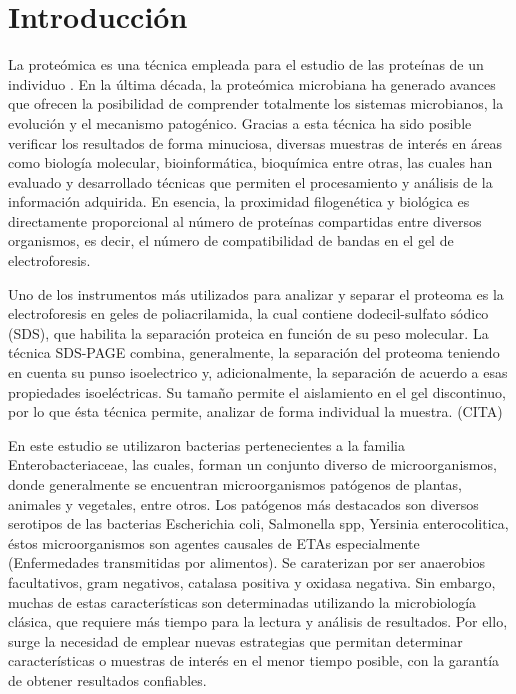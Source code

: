 \documentclass[%
 reprint,
 amsmath,amssymb,
 aps,
showkeys,
letter,
12pts
]{revtex4-1}
\begin{document}
\maketitle


\section{\label{sec:Intro}Introducción}
	La proteómica es una técnica empleada para el estudio de las proteínas de un individuo \cite{intro1}. En la última década, la proteómica microbiana ha generado avances que ofrecen la  posibilidad de comprender totalmente los sistemas microbianos, la evolución y el mecanismo patogénico\cite{intro1}. Gracias a esta técnica ha sido posible verificar los resultados de forma minuciosa, diversas muestras de interés en áreas como biología molecular, bioinformática, bioquímica entre otras, las cuales han evaluado y desarrollado técnicas que permiten el procesamiento y análisis de la información adquirida. En esencia, la proximidad filogenética y biológica es directamente proporcional al número de proteínas compartidas entre diversos organismos, es decir, el número de compatibilidad de bandas en el gel de electroforesis.
	
	Uno de los instrumentos más utilizados para analizar y separar el proteoma es la electroforesis en geles de poliacrilamida, la cual contiene dodecil-sulfato sódico (SDS), que habilita la separación proteica en función de su peso molecular. La técnica SDS-PAGE combina, generalmente, la separación del proteoma teniendo en cuenta su punso isoelectrico y, adicionalmente, la separación de acuerdo a  esas propiedades isoeléctricas. Su tamaño permite el aislamiento en el gel discontinuo, por lo que ésta técnica permite, analizar de forma individual la muestra. (CITA)
	
	En este estudio se utilizaron  bacterias pertenecientes a la familia Enterobacteriaceae, las cuales, forman un conjunto diverso de microorganismos, donde generalmente se encuentran microorganismos patógenos de plantas, animales y vegetales, entre otros. Los patógenos más destacados son diversos serotipos de las bacterias Escherichia coli, Salmonella spp, Yersinia enterocolitica, éstos microorganismos son agentes causales de ETAs especialmente (Enfermedades transmitidas por alimentos). Se caraterizan por ser anaerobios facultativos, gram negativos, catalasa positiva y oxidasa negativa\cite{intro2}. Sin embargo, muchas de estas características son determinadas utilizando la microbiología clásica, que requiere más tiempo para la lectura y análisis de resultados. Por ello, surge la necesidad de emplear nuevas estrategias que permitan determinar características o muestras de interés en el menor tiempo posible, con la garantía de obtener resultados confiables.
	
\end{document}
